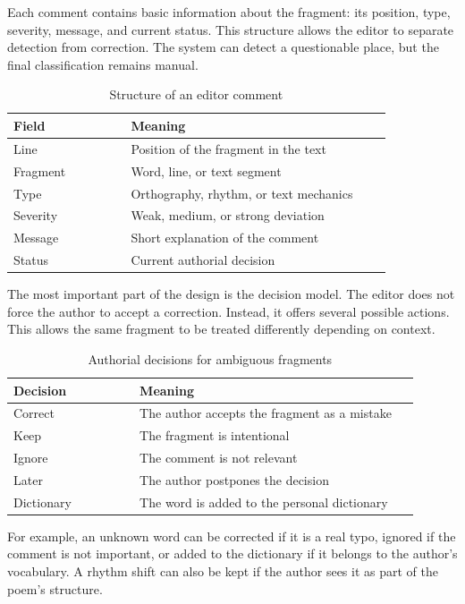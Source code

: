 \documentclass[sigconf]{acmart}
\begin{document}
Each comment contains basic information about the fragment: its position, type, severity, message, and current status. This structure allows the editor to separate detection from correction. The system can detect a questionable place, but the final classification remains manual.

\begin{table}[h]
\caption{Structure of an editor comment}
\label{tab:comment-structure}
\begin{tabular}{p{0.28\linewidth}p{0.62\linewidth}}
\toprule
Field & Meaning \\
\midrule
Line & Position of the fragment in the text \\
Fragment & Word, line, or text segment \\
Type & Orthography, rhythm, or text mechanics \\
Severity & Weak, medium, or strong deviation \\
Message & Short explanation of the comment \\
Status & Current authorial decision \\
\bottomrule
\end{tabular}
\end{table}

The most important part of the design is the decision model. The editor does not force the author to accept a correction. Instead, it offers several possible actions. This allows the same fragment to be treated differently depending on context.

\begin{table}[h]
\caption{Authorial decisions for ambiguous fragments}
\label{tab:decisions}
\begin{tabular}{p{0.28\linewidth}p{0.62\linewidth}}
\toprule
Decision & Meaning \\
\midrule
Correct & The author accepts the fragment as a mistake \\
Keep & The fragment is intentional \\
Ignore & The comment is not relevant \\
Later & The author postpones the decision \\
Dictionary & The word is added to the personal dictionary \\
\bottomrule
\end{tabular}
\end{table}

For example, an unknown word can be corrected if it is a real typo, ignored if the comment is not important, or added to the dictionary if it belongs to the author's vocabulary. A rhythm shift can also be kept if the author sees it as part of the poem's structure.
\end{document}
